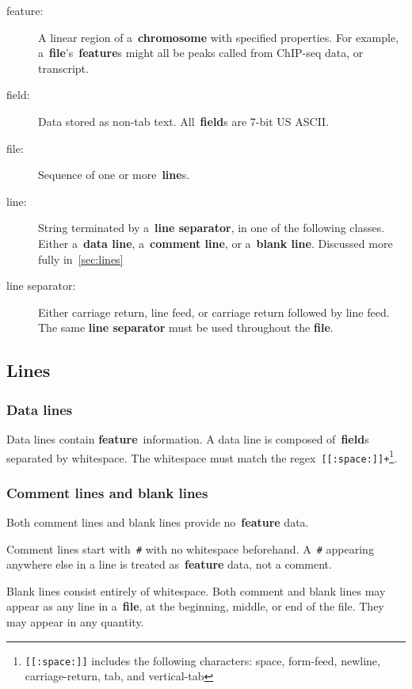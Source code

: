 \documentclass[11pt]{article}
\begin{document}
\begin{description}
\item[feature:]
  A linear region of a~\textbf{chromosome} with specified properties.
  For example, a~\textbf{file}'s~\textbf{feature}s might all be peaks called from ChIP-seq data, or transcript.

\item[field:]
  Data stored as non-tab text.
  All~\textbf{field}s are 7-bit US \ac{ASCII}.

\item[file:]
  Sequence of one or more~\textbf{line}s.

\item[line:]
  String terminated by a~\textbf{line separator}, in one of the following classes.
  Either a~\textbf{data line}, a~\textbf{comment line}, or a~\textbf{blank line}.
  Discussed more fully in~\autoref{sec:lines}

\item[line separator:]
  Either carriage return, line feed, or carriage return followed by line feed.
  The same \textbf{line separator} must be used throughout the \textbf{file}.
\end{description}

\subsection{Lines}\label{sec:lines}

\subsubsection{Data lines}

Data lines contain \textbf{feature}~information.
A data line is composed of~\textbf{field}s separated by whitespace.
The whitespace must match the \ac{regex}~\texttt{[[:space:]]+}\footnote{\texttt{[[:space:]]} includes the following characters: space, form-feed, newline, carriage-return, tab, and vertical-tab}.

\subsubsection{Comment lines and blank lines}

Both comment lines and blank lines provide no~\textbf{feature} data.

Comment lines start with~\texttt{\#} with no whitespace beforehand.
A~\texttt{\#} appearing anywhere else in a line is treated as~\textbf{feature} data, not a comment.

Blank lines consist entirely of whitespace.
Both comment and blank lines may appear as any line in a~\textbf{file}, at the beginning, middle, or end of the file.
They may appear in any quantity.
\end{document}

